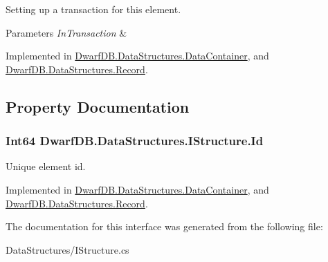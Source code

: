 Setting up a transaction for this element. 


\begin{DoxyParams}{Parameters}
{\em InTransaction} & \\
\hline
\end{DoxyParams}


Implemented in \hyperlink{class_dwarf_d_b_1_1_data_structures_1_1_data_container_a40b2dc31b54b0d41b29e58ea5ea4a3fb}{DwarfDB.DataStructures.DataContainer}, and \hyperlink{class_dwarf_d_b_1_1_data_structures_1_1_record_a4997c638afaaa5b8f281a492b639dfca}{DwarfDB.DataStructures.Record}.



\subsection{Property Documentation}
\hypertarget{interface_dwarf_d_b_1_1_data_structures_1_1_i_structure_a20776b8ffebc8d77080ef4b9e9817e85}{
\subsubsection[{Id}]{\setlength{\rightskip}{0pt plus 5cm}Int64 DwarfDB.DataStructures.IStructure.Id}}
\label{interface_dwarf_d_b_1_1_data_structures_1_1_i_structure_a20776b8ffebc8d77080ef4b9e9817e85}


Unique element id. 



Implemented in \hyperlink{class_dwarf_d_b_1_1_data_structures_1_1_data_container_a3749f4fe324b56d46caf071488c615d7}{DwarfDB.DataStructures.DataContainer}, and \hyperlink{class_dwarf_d_b_1_1_data_structures_1_1_record_a6b9df97308b20ff8504cd88c56aded41}{DwarfDB.DataStructures.Record}.



The documentation for this interface was generated from the following file:\begin{DoxyCompactItemize}
\item 
DataStructures/IStructure.cs\end{DoxyCompactItemize}
